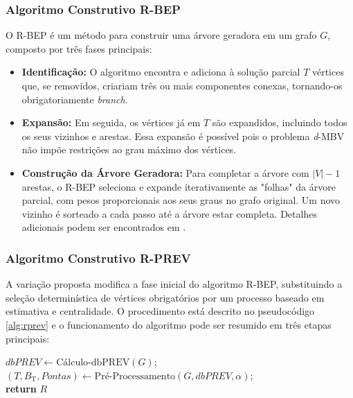 \subsubsection{Algoritmo Construtivo R-BEP}
\label{sec:rbep}
O R-BEP é um método para construir uma árvore geradora em um grafo $G$, composto por três fases principais:
\begin{itemize}
    \item \textbf{Identificação:} O algoritmo encontra e adiciona à solução parcial $T$ vértices que, se removidos, criariam três ou mais componentes conexas, tornando-os obrigatoriamente \textit{branch}.
    \item \textbf{Expansão:} Em seguida, os vértices já em $T$ são expandidos, incluindo todos os seus vizinhos e arestas. Essa expansão é possível pois o problema \textit{d}-MBV não impõe restrições ao grau máximo dos vértices.
    \item \textbf{Construção da Árvore Geradora:} Para completar a árvore com $|V|-1$ arestas, o R-BEP seleciona e expande iterativamente as "folhas" da árvore parcial, com pesos proporcionais aos seus graus no grafo original. Um novo vizinho é sorteado a cada passo até a árvore estar completa. Detalhes adicionais podem ser encontrados em \cite{oliveira:2023}.
\end{itemize}





\subsubsection{Algoritmo Construtivo R-PREV}
\label{sec:rprev}
A variação proposta modifica a fase inicial do algoritmo R-BEP, substituindo a seleção determinística de vértices obrigatórios por um processo baseado em estimativa e centralidade. O procedimento está descrito no pseudocódigo \ref{alg:rprev} e o funcionamento do algoritmo pode ser resumido em três etapas principais:


\begin{algorithm}

\caption{R-PREV}
\label{alg:rprev}
\SetAlgoLined
{}
$dbPREV \gets \text{Cálculo-dbPREV}(G)$;
\label{lin:calculo_dbPREV}\\
$(T, B_{\text{T}}, Pontas) \gets \text{Pré-Processamento}(G, dbPREV, \alpha)$;\label{lin:PreProcessamento}\\
\label{lin:fimloopRPREV}
\textbf{return} $R$\;
\end{algorithm}



